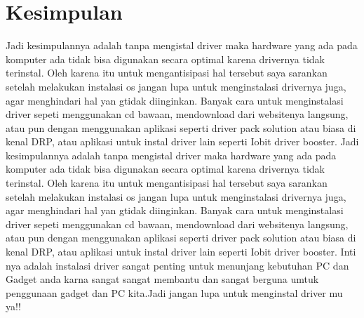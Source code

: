 \section{Kesimpulan}
Jadi kesimpulannya adalah tanpa mengistal driver maka hardware yang ada pada komputer ada tidak bisa digunakan secara optimal karena drivernya tidak terinstal. Oleh karena itu untuk mengantisipasi hal tersebut saya sarankan setelah melakukan instalasi os jangan lupa untuk menginstalasi drivernya juga, agar menghindari hal yan gtidak diinginkan. Banyak cara untuk menginstalasi driver sepeti menggunakan cd bawaan, mendownload dari websitenya langsung, atau pun dengan menggunakan aplikasi seperti driver pack solution atau biasa di kenal DRP, atau aplikasi untuk instal driver lain seperti Iobit driver booster.
Jadi kesimpulannya adalah tanpa mengistal driver maka hardware yang ada pada komputer ada tidak bisa digunakan secara optimal karena drivernya tidak terinstal. Oleh karena itu untuk mengantisipasi hal tersebut saya sarankan setelah melakukan instalasi os jangan lupa untuk menginstalasi drivernya juga, agar menghindari hal yan gtidak diinginkan. Banyak cara untuk menginstalasi driver sepeti menggunakan cd bawaan, mendownload dari websitenya langsung, atau pun dengan menggunakan aplikasi seperti driver pack solution atau biasa di kenal DRP, atau aplikasi untuk instal driver lain seperti Iobit driver booster. Inti nya adalah instalasi driver sangat penting untuk menunjang kebutuhan PC dan Gadget anda karna sangat sangat membantu dan sangat berguna umtuk penggunaan gadget dan PC kita.Jadi jangan lupa untuk menginstal driver mu ya!!

%
